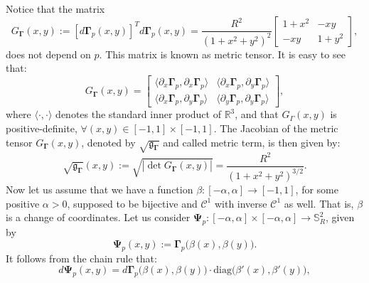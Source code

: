 Notice that the matrix
\begin{equation*}
	\label{chp-cs-eqdistant-Gammatensor}
	G_{\boldsymbol{\Gamma}}(x,y) := 
	[d\boldsymbol{\Gamma}_{p}(x,y)]^Td\boldsymbol{\Gamma}_{p}(x,y)
	= \frac{R^2}{(1 + x^2 + y^2)^2}
	\begin{bmatrix}
		  1+ x^2 &  -xy \\
		 -xy & 1 + y^2
	\end{bmatrix},
\end{equation*}
does not depend on $p$.
This matrix is known as metric tensor.
It is easy to see that:
\begin{equation}
	\label{chp-cs-eqdistant-Gamma-metric-tensor}
	G_{\boldsymbol{\Gamma}}(x,y) = 
	\begin{bmatrix}
		\langle  {\partial_x \boldsymbol{\Gamma}_p}, {\partial_x  \boldsymbol{\Gamma}_p} \rangle & 
		\langle  {\partial_x \boldsymbol{\Gamma}_p}, {\partial_y  \boldsymbol{\Gamma}_p} \rangle \\
		\langle  {\partial_x  \boldsymbol{\Gamma}_p}, {\partial_y  \boldsymbol{\Gamma}_p} \rangle  &
		\langle  {\partial_y  \boldsymbol{\Gamma}_p}, {\partial_y  \boldsymbol{\Gamma}_p} \rangle 
	\end{bmatrix},
\end{equation}
where $\langle \cdot, \cdot \rangle$ denotes 
the standard inner product of $\mathbb{R}^3$,
and that $G_{\Gamma}(x,y)$ is positive-definite, 
$\forall (x,y) \in [-1,1]\times[-1,1]$.
The Jacobian of the metric tensor $G_{\boldsymbol{\Gamma}}(x,y)$, denoted by $\sqrt{\mathfrak{g}_{\boldsymbol{\Gamma}}}$ and called metric term, is then given by:
\begin{equation*}
        \sqrt{\mathfrak{g}_{\boldsymbol{\Gamma}}}(x,y) :=
	\sqrt{|\det{G_{\boldsymbol{\Gamma}}(x,y)}|} = \frac{R^2}{(1+x^2+y^2)^{3/2}}.
\end{equation*}
Now let us assume that we have a function $\beta:[-\alpha,\alpha] \to [-1,1]$, for some positive $\alpha>0$,
supposed to be bijective and $\mathcal{C}^1$ with inverse $\mathcal{C}^1$ as well.
That is, $\beta$ is a change of coordinates.
Let us consider $ \boldsymbol{\Psi}_p: [-\alpha,\alpha]\times [-\alpha,\alpha] \to \mathbb{S}^2_R$,
given by 
\begin{equation*}
	\boldsymbol{\Psi}_p(x,y) := \boldsymbol{\Gamma}_p\big(\beta(x),\beta(y)\big).
\end{equation*}
It follows from the chain rule that:
\begin{equation*}
        d \boldsymbol{\Psi}_p(x,y) = d \boldsymbol{\Gamma}_p\big(\beta(x),\beta(y)\big)\cdot\text{diag}\big(\beta'(x),\beta'(y)\big),
\end{equation*}
